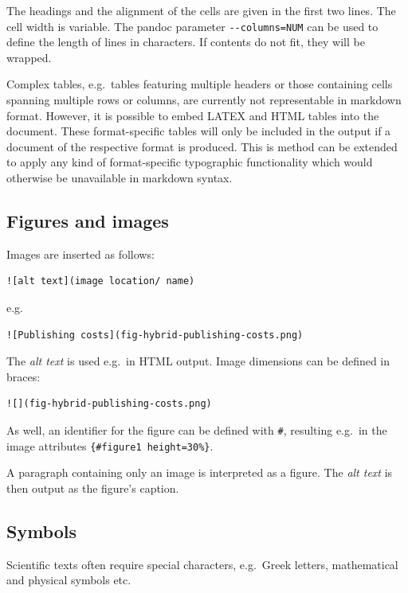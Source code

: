 \documentclass[10pt,fleqn]{wlpeerj}
\begin{document}
The headings and the alignment of the cells are given in the first two
lines. The cell width is variable. The pandoc parameter
\texttt{-\/-columns=NUM} can be used to define the length of lines in
characters. If contents do not fit, they will be wrapped.

Complex tables, e.g.~tables featuring multiple headers or those
containing cells spanning multiple rows or columns, are currently not
representable in markdown format. However, it is possible to embed LATEX
and HTML tables into the document. These format-specific tables will
only be included in the output if a document of the respective format is
produced. This is method can be extended to apply any kind of
format-specific typographic functionality which would otherwise be
unavailable in markdown syntax.

\subsection{Figures and images}\label{figures-and-images}

Images are inserted as follows:

\begin{verbatim}
![alt text](image location/ name)
\end{verbatim}

e.g.

\begin{verbatim}
![Publishing costs](fig-hybrid-publishing-costs.png)
\end{verbatim}

The \emph{alt text} is used e.g.~in HTML output. Image dimensions can be
defined in braces:

\begin{verbatim}
![](fig-hybrid-publishing-costs.png)
\end{verbatim}

As well, an identifier for the figure can be defined with \texttt{\#},
resulting e.g.~in the image attributes
\texttt{\{\#figure1\ height=30\%\}}.

A paragraph containing only an image is interpreted as a figure. The
\emph{alt text} is then output as the figure's caption.

\subsection{Symbols}\label{symbols}

Scientific texts often require special characters, e.g.~Greek letters,
mathematical and physical symbols etc.
\end{document}
